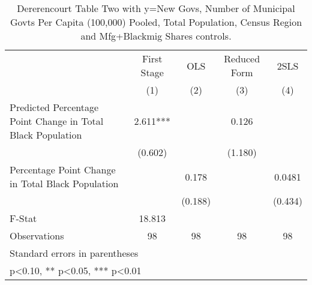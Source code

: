 \begin{table}[htbp]\centering
\def\sym#1{\ifmmode^{#1}\else\(^{#1}\)\fi}
\caption{Dererencourt Table Two with y=New Govs, Number of Municipal Govts Per Capita (100,000) Pooled, Total Population, Census Region and Mfg+Blackmig Shares controls.}
\begin{tabular}{l*{4}{c}}
\toprule
                    & First Stage   &         OLS   &Reduced Form   &        2SLS   \\
                    &\multicolumn{1}{c}{(1)}   &\multicolumn{1}{c}{(2)}   &\multicolumn{1}{c}{(3)}   &\multicolumn{1}{c}{(4)}   \\
\midrule
Predicted Percentage Point Change in Total Black Population&       2.611***&               &       0.126   &               \\
                    &     (0.602)   &               &     (1.180)   &               \\
\addlinespace
Percentage Point Change in Total Black Population&               &       0.178   &               &      0.0481   \\
                    &               &     (0.188)   &               &     (0.434)   \\
\midrule
F-Stat              &      18.813   &               &               &               \\
Observations        &          98   &          98   &          98   &          98   \\
\bottomrule
\multicolumn{5}{l}{\footnotesize Standard errors in parentheses}\\
\multicolumn{5}{l}{\footnotesize * p<0.10, ** p<0.05, *** p<0.01}\\
\end{tabular}
\end{table}
